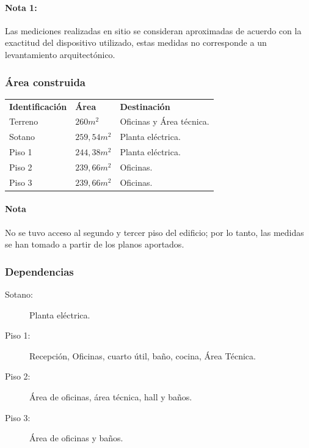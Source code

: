 \documentclass[12pt,a4paper,twoside]{article}
\begin{document}
\paragraph{Nota 1:} Las mediciones realizadas en sitio se consideran aproximadas de acuerdo con la exactitud del dispositivo utilizado, estas medidas no corresponde a un levantamiento arquitectónico.
%
\subsubsection{Área construida}
%
\begin{center}
%	
	\begin{tabular}{ ||l| |l| |l|| }
%		
	\textbf{Identificación} & \textbf{Área} & \textbf{Destinación} \\
		Terreno & $260 m^{2}$ & Oficinas y Área técnica. \\
		Sotano & $259,54 m^{2}$ & Planta eléctrica.  \\
		Piso 1 & $244,38 m^{2}$ & Planta eléctrica.  \\
		Piso 2 & $239,66 m^{2}$ & Oficinas.  \\
		Piso 3 & $239,66 m^{2}$ & Oficinas.  \\
	\end{tabular}
\end{center}
%
\paragraph{Nota} 
No se tuvo acceso al segundo y tercer piso del edificio; por lo tanto, las medidas se han tomado a partir de los planos aportados. 
%
\subsubsection{Dependencias}
%
\begin{description}
%
\item[Sotano:] Planta eléctrica.	
\item[Piso 1:] Recepción, Oficinas, cuarto útil, baño, cocina, Área Técnica. 
\item[Piso 2:] Área de oficinas, área técnica, hall y baños.
\item[Piso 3:] Área de oficinas y baños.
%
\end{description}
%
\end{document}
